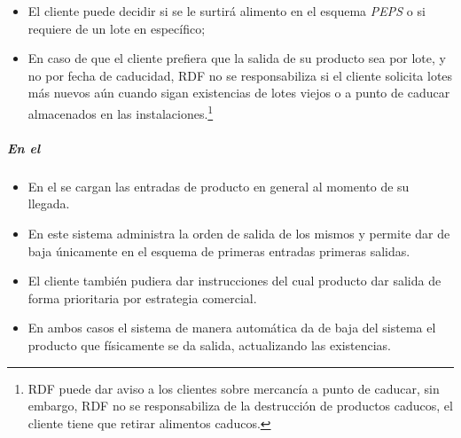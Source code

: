 \begin{note} \label{nota:PEPS}
\begin{itemize}
		\item El cliente puede decidir si se le surtirá \gls{alimento} en el esquema \emph{PEPS} o si requiere de un lote en específico;
		\item En caso de que el cliente prefiera que la salida de su producto sea por lote, y no por fecha de caducidad, \gls{RDF} no se responsabiliza si el cliente solicita lotes más nuevos aún cuando sigan existencias de lotes viejos o a punto de caducar almacenados en las instalaciones.\footnote{\gls{RDF} puede dar aviso a los clientes sobre mercancía a punto de caducar, sin embargo, \gls{RDF} no se responsabiliza de la destrucción de productos caducos, el cliente tiene que retirar \glspl{alimento} caducos.}
\end{itemize}
\end{note}


\subparagraph{En el }

\begin{itemize}
	\item En el  se cargan las entradas de producto en general al momento de su llegada.
	\item En este sistema administra la orden de salida de los mismos y permite dar de baja únicamente en el esquema de primeras entradas primeras salidas.
	\item El cliente también pudiera dar instrucciones del cual producto dar salida de forma prioritaria por estrategia comercial.
	\item En ambos casos el sistema de manera automática da de baja del sistema el producto que físicamente se da salida, actualizando las existencias.
\end{itemize}

